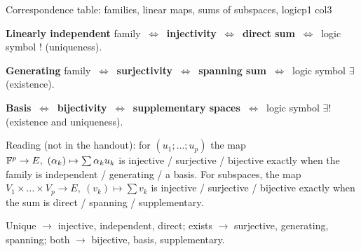 \documentclass[course,noautoquant,noautokw]{neyvia-study}
\begin{document}
\begin{concept}[1.28]{Correspondence table: families, linear maps, sums of subspaces, logic}{p1 col3}
\begin{definition}
\noindent \textbf{Linearly independent} family $\ \iff\ $ \textbf{injectivity} $\ \iff\ $ \textbf{direct sum} $\ \iff\ $ logic symbol $!$ (uniqueness).
\par\noindent \textbf{Generating} family $\ \iff\ $ \textbf{surjectivity} $\ \iff\ $ \textbf{spanning sum} $\ \iff\ $ logic symbol $\exists$ (existence).
\par\noindent \textbf{Basis} $\ \iff\ $ \textbf{bijectivity} $\ \iff\ $ \textbf{supplementary spaces} $\ \iff\ $ logic symbol $\exists!$ (existence and uniqueness).
\par\noindent Reading (not in the handout): for $(u_1;\dots;u_p)$ the map $\F^p\to E,\ (\alpha_k)\mapsto\sum\alpha_k u_k$ is injective / surjective / bijective exactly when the family is independent / generating / a basis. For subspaces, the map $V_1\times\dots\times V_p\to E,\ (v_k)\mapsto\sum v_k$ is injective / surjective / bijective exactly when the sum is direct / spanning / supplementary.
\end{definition}
\begin{reflex}
Unique \ensuremath{\rightarrow} injective, independent, direct; exists \ensuremath{\rightarrow} surjective, generating, spanning; both \ensuremath{\rightarrow} bijective, basis, supplementary.
\end{reflex}
\begin{traps}
\end{traps}
\end{concept}
\end{document}
